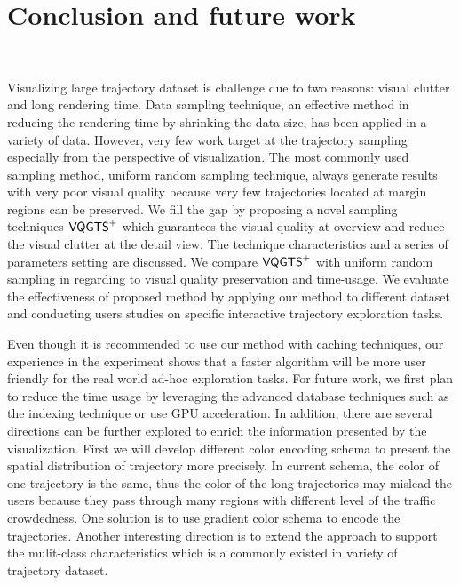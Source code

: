 \section{Conclusion and future work}~\label{sec:con}

Visualizing large trajectory dataset is challenge due to two reasons: visual clutter and long rendering time.
Data sampling technique, an effective method in reducing the rendering time by shrinking the data size, has been applied in a variety of data.
However, very few work target at the trajectory sampling especially from the perspective of visualization.
The most commonly used sampling method, uniform random sampling technique, always generate results with very poor visual quality because very few trajectories located at margin regions can be preserved.
We fill the gap by proposing a novel sampling techniques $\mathsf{VQGTS}^{+}$ which guarantees the visual quality at overview and reduce the visual clutter at the detail view. The technique characteristics and a series of parameters setting are discussed.
We compare $\mathsf{VQGTS}^{+}$ with uniform random sampling in regarding to visual quality preservation and time-usage. We evaluate the effectiveness of proposed method by applying our method to different dataset and conducting users studies on specific interactive trajectory exploration tasks.


Even though it is recommended to use our method with caching techniques, our experience in the experiment shows that a faster algorithm will be more user friendly for the real world ad-hoc exploration tasks. For future work, we first plan to reduce the time usage by leveraging the advanced database techniques such as the indexing technique or use GPU acceleration. 
In addition, there are several directions can be further explored to enrich the information presented by the visualization. 
First we will develop different color encoding schema to present the spatial distribution of trajectory more precisely. 
In current schema, the color of one trajectory is the same, thus the color of the long trajectories may mislead the users because they pass  through many regions with different level of the traffic crowdedness. One solution is to use gradient color schema to encode the trajectories.
Another interesting direction is to extend the approach to support the mulit-class characteristics which is a commonly existed in variety of trajectory dataset.